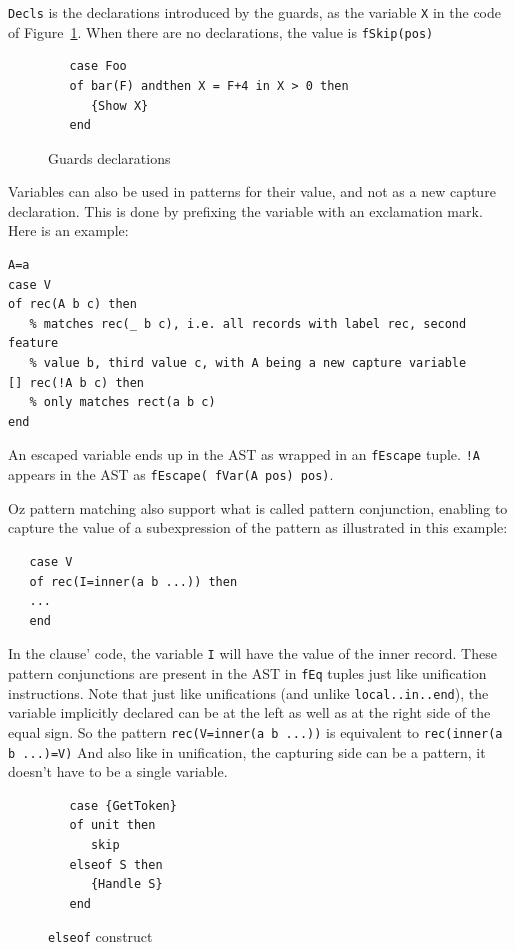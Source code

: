 \documentclass[a4paper]{memoir}
\begin{document}
\lstinline!Decls! is the declarations introduced by the guards, as the variable \lstinline!X! in the code of Figure~\ref{fig:guardsdecls}.
When there are no declarations, the value is \lstinline!fSkip(pos)!

\begin{figure}[h]
\begin{lstlisting}
   case Foo
   of bar(F) andthen X = F+4 in X > 0 then 
      {Show X}
   end
\end{lstlisting}
\caption{Guards declarations}
\label{fig:guardsdecls}
\end{figure}


Variables can also be used in patterns for their value, and not as a new capture
declaration. This is done by prefixing the variable with an exclamation mark.
Here is an example:

\begin{lstlisting}
A=a
case V
of rec(A b c) then
   % matches rec(_ b c), i.e. all records with label rec, second feature 
   % value b, third value c, with A being a new capture variable
[] rec(!A b c) then
   % only matches rect(a b c)
end
\end{lstlisting}

An escaped variable ends up in the AST as wrapped in an \lstinline!fEscape!
tuple. \lstinline$!A$ appears in the AST as \lstinline!fEscape( fVar(A pos) pos)!.

Oz pattern matching also support what is called pattern conjunction, enabling to
capture the value of a subexpression of the pattern as illustrated in this example:
\begin{lstlisting}
   case V 
   of rec(I=inner(a b ...)) then
   ...
   end
\end{lstlisting}

In the clause' code, the variable \lstinline!I! will have the value of the inner record.
These pattern conjunctions are present in the AST in \lstinline!fEq! tuples just 
like unification instructions.
Note that just like unifications (and unlike \lstinline!local..in..end!), the variable implicitly declared can be at the
left as well as at the right side of the equal sign. So the pattern
\lstinline!rec(V=inner(a b ...))! is equivalent to \lstinline!rec(inner(a b ...)=V)!
And also like in unification, the capturing side can be a pattern, it doesn't
have to be a single variable.

\begin{figure}[h]
\begin{lstlisting}
   case {GetToken}
   of unit then
      skip
   elseof S then
      {Handle S}
   end
\end{lstlisting}
\caption{\lstinline!elseof! construct}
\label{fig:input:elseof}
\end{figure}
\end{document}
